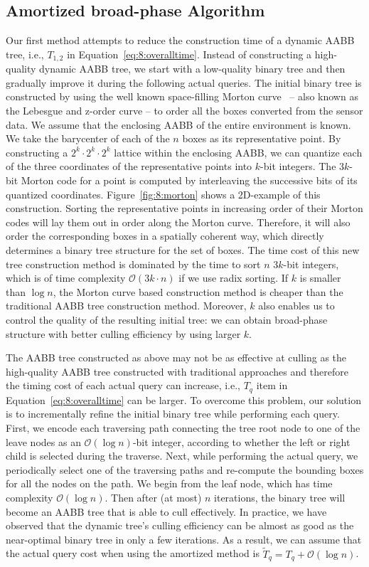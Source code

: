 \subsection{Amortized broad-phase Algorithm}
Our first method attempts to reduce the construction time of a dynamic
AABB tree, i.e., $T_{1,2}$ in Equation~\ref{eq:8:overalltime}. Instead
of constructing a high-quality dynamic AABB tree, we start with a low-quality binary tree and then gradually improve it during the following
actual queries. The initial binary tree is constructed by using the
well known space-filling Morton curve~\cite{Morton:1966} -- also known as the Lebesgue
and z-order curve -- to order all the boxes converted from the sensor data. We assume that the
enclosing AABB of the entire environment is known. We take the
barycenter of each of the $n$ boxes as its representative point. By
constructing a $2^k \cdot 2^k \cdot 2^k$ lattice within the enclosing
AABB, we can quantize each of the three coordinates of the
representative points into $k$-bit integers. The $3k$-bit Morton code
for a point is computed by interleaving the successive bits of its
quantized coordinates. Figure~\ref{fig:8:morton} shows a 2D-example of
this construction. Sorting the representative points in increasing
order of their Morton codes will lay them out in order along the
Morton curve. Therefore, it will also order the corresponding boxes
in a spatially coherent way, which directly determines a binary tree
structure for the set of boxes. The time cost of this new tree
construction method is dominated by the time to sort $n$ $3k$-bit
integers, which is of time complexity $\mathcal O(3k \cdot n)$ if we
use radix sorting. If $k$ is smaller than $\log n$, the Morton curve
based construction method is cheaper than the traditional AABB tree
construction method. Moreover, $k$ also enables us to control the
quality of the resulting initial tree: we can obtain broad-phase
structure with better culling efficiency by using larger $k$.

The AABB tree constructed as above may not be as effective at culling
as the high-quality AABB tree constructed with traditional approaches and therefore the timing cost of each actual query can increase, i.e., $T_q$ item in Equation~\ref{eq:8:overalltime}
can be larger. To overcome this problem, our solution is to
incrementally refine the initial binary tree while performing each
query. First, we encode each traversing path
connecting the tree root node to one of the leave nodes as an $\mathcal
O(\log n)$-bit integer, according to whether the left or right child
is selected during the traverse. Next, while performing the actual query, we
periodically select one of the traversing paths and re-compute the
bounding boxes for all the nodes on the path. We begin from the leaf
node, which has time complexity $\mathcal O(\log n)$. Then after (at most) $n$ iterations, the binary tree will become an AABB tree that is able to cull effectively. In practice, we have observed that the dynamic
tree's culling efficiency can be almost as good as the near-optimal
binary tree in only a few iterations. As a result, we can assume that the
actual query cost when using the amortized method is $\widetilde{T}_q
= T_q + \mathcal O(\log n)$.

